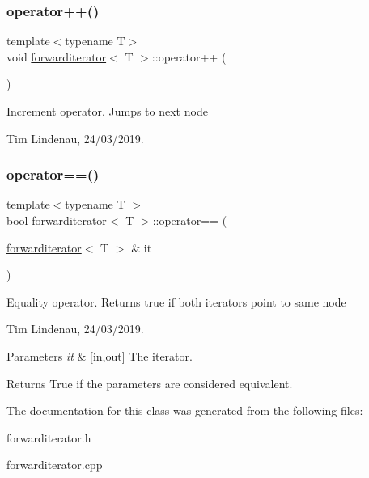 \subsubsection{\texorpdfstring{operator++()}{operator++()}}
{\footnotesize\ttfamily template$<$typename T$>$ \\
void \mbox{\hyperlink{classforwarditerator}{forwarditerator}}$<$ T $>$\+::operator++ (\begin{DoxyParamCaption}{ }\end{DoxyParamCaption})\hspace{0.3cm}{\ttfamily [inline]}}



Increment operator. Jumps to next node 

Tim Lindenau, 24/03/2019. \mbox{\label{classforwarditerator_ab19bc229f24b7682e7faf96c8cebcd27}} 
\subsubsection{\texorpdfstring{operator==()}{operator==()}}
{\footnotesize\ttfamily template$<$typename T $>$ \\
bool \mbox{\hyperlink{classforwarditerator}{forwarditerator}}$<$ T $>$\+::operator== (\begin{DoxyParamCaption}\item[{\mbox{\hyperlink{classforwarditerator}{forwarditerator}}$<$ T $>$ \&}]{it }\end{DoxyParamCaption})}



Equality operator. Returns true if both iterators point to same node 

Tim Lindenau, 24/03/2019. 


\begin{DoxyParams}{Parameters}
{\em it} & \mbox{[}in,out\mbox{]} The iterator. \\
\hline
\end{DoxyParams}


\begin{DoxyReturn}{Returns}
True if the parameters are considered equivalent. 
\end{DoxyReturn}


The documentation for this class was generated from the following files\+:\begin{DoxyCompactItemize}
\item 
forwarditerator.\+h\item 
forwarditerator.\+cpp\end{DoxyCompactItemize}
